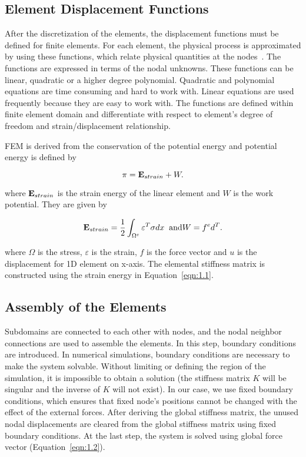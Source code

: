 \subsection{Element Displacement Functions}
\label{sec:edf}

After the discretization of the elements, the displacement functions must be defined for finite elements. For each element, the physical process is approximated by using these functions, which relate physical quantities at the nodes~\cite{Narasaiah08}. The functions are expressed in terms of the nodal unknowns. These functions can be linear, quadratic or a higher degree polynomial. Quadratic and polynomial equations are time consuming and hard to work with. Linear equations are used frequently because they are easy to work with. The functions are defined within finite element domain and differentiate with respect to element's degree of freedom and strain/displacement relationship.

FEM is derived from the conservation of the potential energy and potential energy is defined by

\begin{equation}
\pi =  {\bf E}_{strain} + W.
\label{eqn:1.01}
\end{equation}

\noindent where ${\bf E}_{strain}$ is the strain energy of the linear element and $W$ is the work potential. They are given by

\begin{equation}
{\bf E}_{strain} =  \frac{1}{2} \int_{\Omega^e}\varepsilon^T \sigma dx \;\;\text{and}\\
W = {f^e} {d}^T.
\label{eqn:1.1}
\end{equation}

\noindent where $\Omega$ is the stress, $\varepsilon$ is the strain, $f$ is the force vector and $u$ is the displacement for 1D element on x-axis. The elemental stiffness matrix is constructed using the strain energy in Equation~\ref{eqn:1.1}.

\subsection{Assembly of the Elements}
\label{sec:aote}

Subdomains are connected to each other with nodes, and the nodal neighbor connections are used to assemble the elements. In this step, boundary conditions are introduced. In numerical simulations, boundary conditions are necessary to make the system solvable. Without limiting or defining the region of the simulation, it is impossible to obtain a solution (the stiffness matrix $K$ will be singular and the inverse of $K$ will not exist). In our case, we use fixed boundary conditions, which ensures that fixed node's positions cannot be changed with the effect of the external forces. After deriving the global stiffness matrix, the unused nodal displacements are cleared from the global stiffness matrix using fixed boundary conditions. At the last step, the system is solved using global force vector (Equation~\ref{eqn:1.2}).


